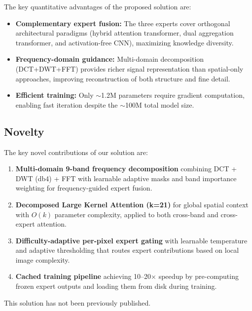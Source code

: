 \documentclass[10pt,twocolumn,letterpaper]{article}
\begin{document}
The key quantitative advantages of the proposed solution are:
\begin{itemize}[nosep]
\item \textbf{Complementary expert fusion:} The three experts cover orthogonal architectural paradigms (hybrid attention transformer, dual aggregation transformer, and activation-free CNN), maximizing knowledge diversity.
\item \textbf{Frequency-domain guidance:} Multi-domain decomposition (DCT+DWT+FFT) provides richer signal representation than spatial-only approaches, improving reconstruction of both structure and fine detail.
\item \textbf{Efficient training:} Only $\sim$1.2M parameters require gradient computation, enabling fast iteration despite the $\sim$100M total model size.
\end{itemize}

\subsection{Novelty}

The key novel contributions of our solution are:

\begin{enumerate}[nosep]
\item \textbf{Multi-domain 9-band frequency decomposition} combining DCT + DWT (db4) + FFT with learnable adaptive masks and band importance weighting for frequency-guided expert fusion.

\item \textbf{Decomposed Large Kernel Attention (k=21)} for global spatial context with $O(k)$ parameter complexity, applied to both cross-band and cross-expert attention.

\item \textbf{Difficulty-adaptive per-pixel expert gating} with learnable temperature and adaptive thresholding that routes expert contributions based on local image complexity.

\item \textbf{Cached training pipeline} achieving 10--20$\times$ speedup by pre-computing frozen expert outputs and loading them from disk during training.
\end{enumerate}

This solution has not been previously published.
\end{document}
